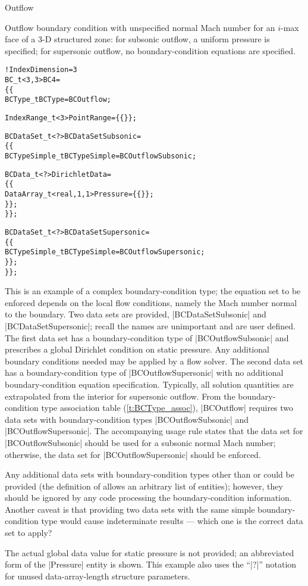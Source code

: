 \begin{example}{Outflow}
\label{ex:bc4}

Outflow boundary condition with unspecified normal Mach number for an
$i$-max face of a 3-D structured zone: for subsonic outflow, a uniform
pressure is specified; for supersonic outflow, no boundary-condition
equations are
specified.
\begin{alltt}
  !  IndexDimension = 3
  BC\_t<3,3> BC4 =
    \{\{
    BCType\_t BCType = BCOutflow ;

    IndexRange\_t<3> PointRange = \{\{ \}\} ;

    BCDataSet\_t<?> BCDataSetSubsonic =
      \{\{
      BCTypeSimple\_t BCTypeSimple = BCOutflowSubsonic ;

      BCData\_t<?> DirichletData =
        \{\{
        DataArray\_t<real, 1, 1> Pressure = \{\{ \}\} ;
        \}\} ;
      \}\} ;

    BCDataSet\_t<?> BCDataSetSupersonic =
      \{\{
      BCTypeSimple\_t BCTypeSimple = BCOutflowSupersonic ;
      \}\} ;
    \}\} ;
\end{alltt}
This is an example of a complex boundary-condition type; the equation
set to be enforced depends on the local flow conditions, namely the Mach
number normal to the boundary.
Two data sets are provided, |BCDataSetSubsonic| and |BCDataSetSupersonic|;
recall the names are unimportant and are user defined.
The first data set has a boundary-condition type of |BCOutflowSubsonic|
and prescribes a global Dirichlet condition on static pressure.
Any additional boundary conditions needed may be applied by a flow solver.
The second data set has a boundary-condition type of |BCOutflowSupersonic|
with no additional boundary-condition equation specification.
Typically, all solution quantities are extrapolated from the interior for
supersonic outflow.
From the boundary-condition type association table
(\autoref{t:BCType_assoc}), |BCOutflow| requires two data sets with
boundary-condition types |BCOutflowSubsonic| and |BCOutflowSupersonic|.
The accompanying usage rule states that the data set for
|BCOutflowSubsonic| should be used for a subsonic normal Mach number;
otherwise, the data set for |BCOutflowSupersonic| should be enforced.

Any additional data sets with boundary-condition types other than
 or  could be
provided (the definition of  allows an arbitrary list of
 entities); however, they should be ignored by any
code processing the boundary-condition information.
Another caveat is that providing two data sets with the same simple
boundary-condition type would cause indeterminate results --- which one is
the correct data set to apply?

The actual global data value for static pressure is not provided; an
abbreviated form of the |Pressure| entity is shown.
This example also uses the ``|?|'' notation for unused data-array-length  
structure parameters.                                                   
\end{example}

